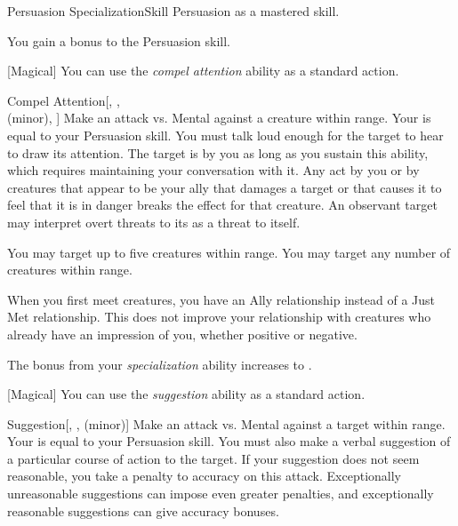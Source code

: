    \begin{feat}{Persuasion Specialization}{Skill}
        \featpre Persuasion as a mastered skill.

         You gain a  bonus to the Persuasion skill.

        [Magical] You can use the \textit{compel attention} ability as a standard action.
        \begin{freeability}{Compel Attention}[, ,\\ (minor), ]
            Make an attack vs. Mental against a creature within \rngmed range.
            Your  is equal to your Persuasion skill.
            You must talk loud enough for the target to hear to draw its attention.
            \hit The target is  by you as long as you sustain this ability, which requires maintaining your conversation with it.
            Any act by you or by creatures that appear to be your ally that damages a target or that causes it to feel that it is in danger breaks the effect for that creature.
            An observant target may interpret overt threats to its  as a threat to itself.

            \rankline
             You may target up to five creatures within range.
             You may target any number of creatures within range.
        \end{freeability}

         When you first meet creatures, you have an Ally relationship instead of a Just Met relationship.
        This does not improve your relationship with creatures who already have an impression of you, whether positive or negative.

         The bonus from your \textit{specialization} ability increases to .

        [Magical] You can use the \textit{suggestion} ability as a standard action.
        \begin{freeability}{Suggestion}[, ,  (minor)]
            Make an attack vs. Mental against a target within \rngmed range.
            Your  is equal to your Persuasion skill.
            You must also make a verbal suggestion of a particular course of action to the target.
            If your suggestion does not seem reasonable, you take a  penalty to accuracy on this attack.
            Exceptionally unreasonable suggestions can impose even greater penalties, and exceptionally reasonable suggestions can give accuracy bonuses.


\end{freeability}
\end{feat}
